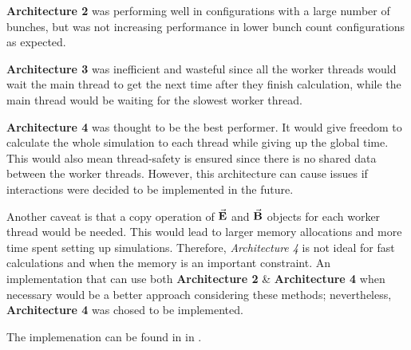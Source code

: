 \documentclass{book}
\begin{document}
\textbf{Architecture 2} was performing well in configurations with a large number of bunches, but was not increasing performance in lower bunch count configurations as expected.

\textbf{Architecture 3} was inefficient and wasteful since all the worker threads would wait the main thread to get the next time after they finish calculation, while the main thread would be waiting for the slowest worker thread.

\textbf{Architecture 4} was thought to be the best performer. It would give freedom to calculate the whole simulation to each thread while giving up the global time.
This would also mean thread-safety is ensured since there is no shared data between the worker threads. 
However, this architecture can cause issues if \ee interactions were decided to be implemented in the future.

Another caveat is that a copy operation of $\vec{\textbf{E}}$ and $\vec{\textbf{B}}$ objects for each worker thread would be needed.
This would lead to larger memory allocations and more time spent setting up simulations. 
Therefore, \textit{Architecture 4} is not ideal for fast calculations and when the memory is an important constraint.
An implementation that can use both \textbf{Architecture 2} \& \textbf{Architecture 4} when necessary would be a better approach considering these methods;
nevertheless, \textbf{Architecture 4} was chosed to be implemented.

The implemenation can be found in  in .




\appendix
\end{document}
